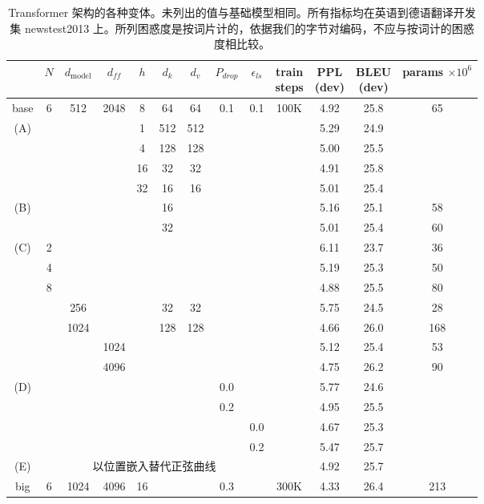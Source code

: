 \documentclass[11pt,UTF8,fontset=fandol]{ctexart}
\newcommand{\dmodel}{d_{\mathrm{model}}}
\begin{document}
\begin{table}[H]\centering
\caption{Transformer 架构的各种变体。未列出的值与基础模型相同。所有指标均在英语到德语翻译开发集 newstest2013 上。所列困惑度是按词片计的，依据我们的字节对编码，不应与按词计的困惑度相比较。}
\label{tab:3}
\setlength{\tabcolsep}{4pt}
\begin{tabular}{c|cccccccc|cccc}
\toprule
 & $N$ & $\dmodel$ & $d_{ff}$ & $h$ & $d_k$ & $d_v$ & $P_{drop}$ & $\epsilon_{ls}$ & \makecell{train\\steps} & \makecell{PPL\\(dev)} & \makecell{BLEU\\(dev)} & \makecell{params\\$\times 10^6$} \\
\midrule
base & 6 & 512 & 2048 & 8 & 64 & 64 & 0.1 & 0.1 & 100K & 4.92 & 25.8 & 65 \\
\midrule
\multirow{4}{*}{(A)} & & & & 1 & 512 & 512 & & & & 5.29 & 24.9 & \\
 & & & & 4 & 128 & 128 & & & & 5.00 & 25.5 & \\
 & & & & 16 & 32 & 32 & & & & 4.91 & 25.8 & \\
 & & & & 32 & 16 & 16 & & & & 5.01 & 25.4 & \\
\midrule
\multirow{2}{*}{(B)} & & & & & 16 & & & & & 5.16 & 25.1 & 58 \\
 & & & & & 32 & & & & & 5.01 & 25.4 & 60 \\
\midrule
\multirow{7}{*}{(C)} & 2 & & & & & & & & & 6.11 & 23.7 & 36 \\
 & 4 & & & & & & & & & 5.19 & 25.3 & 50 \\
 & 8 & & & & & & & & & 4.88 & 25.5 & 80 \\
 & & 256 & & & 32 & 32 & & & & 5.75 & 24.5 & 28 \\
 & & 1024 & & & 128 & 128 & & & & 4.66 & 26.0 & 168 \\
 & & & 1024 & & & & & & & 5.12 & 25.4 & 53 \\
 & & & 4096 & & & & & & & 4.75 & 26.2 & 90 \\
\midrule
\multirow{4}{*}{(D)} & & & & & & & 0.0 & & & 5.77 & 24.6 & \\
 & & & & & & & 0.2 & & & 4.95 & 25.5 & \\
 & & & & & & & & 0.0 & & 4.67 & 25.3 & \\
 & & & & & & & & 0.2 & & 5.47 & 25.7 & \\
\midrule
(E) & \multicolumn{8}{c|}{以位置嵌入替代正弦曲线} & & 4.92 & 25.7 & \\
\midrule
big & 6 & 1024 & 4096 & 16 & & & 0.3 & & 300K & 4.33 & 26.4 & 213 \\
\bottomrule
\end{tabular}
\end{table}
\end{document}
